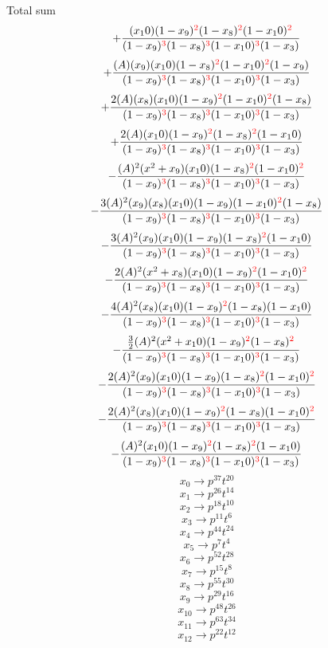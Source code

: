 \documentclass{article}
\begin{document}
Total sum
\[+\frac{(x_10)(1-x_9)^{\textcolor{red}{2}}(1-x_8)^{\textcolor{red}{2}}(1-x_10)^{\textcolor{red}{2}}}{(1-x_9)^{\textcolor{red}{3}}(1-x_8)^{\textcolor{red}{3}}(1-x_10)^{\textcolor{red}{3}}(1-x_3)}\]\[+\frac{(A)(x_9)(x_10)(1-x_8)^{\textcolor{red}{2}}(1-x_10)^{\textcolor{red}{2}}(1-x_9)}{(1-x_9)^{\textcolor{red}{3}}(1-x_8)^{\textcolor{red}{3}}(1-x_10)^{\textcolor{red}{3}}(1-x_3)}\]\[+\frac{2(A)(x_8)(x_10)(1-x_9)^{\textcolor{red}{2}}(1-x_10)^{\textcolor{red}{2}}(1-x_8)}{(1-x_9)^{\textcolor{red}{3}}(1-x_8)^{\textcolor{red}{3}}(1-x_10)^{\textcolor{red}{3}}(1-x_3)}\]\[+\frac{2(A)(x_10)(1-x_9)^{\textcolor{red}{2}}(1-x_8)^{\textcolor{red}{2}}(1-x_10)}{(1-x_9)^{\textcolor{red}{3}}(1-x_8)^{\textcolor{red}{3}}(1-x_10)^{\textcolor{red}{3}}(1-x_3)}\]\[-\frac{(A)^{2}(x^{2}+x_9)(x_10)(1-x_8)^{\textcolor{red}{2}}(1-x_10)^{\textcolor{red}{2}}}{(1-x_9)^{\textcolor{red}{3}}(1-x_8)^{\textcolor{red}{3}}(1-x_10)^{\textcolor{red}{3}}(1-x_3)}\]\[-\frac{3(A)^{2}(x_9)(x_8)(x_10)(1-x_9)(1-x_10)^{\textcolor{red}{2}}(1-x_8)}{(1-x_9)^{\textcolor{red}{3}}(1-x_8)^{\textcolor{red}{3}}(1-x_10)^{\textcolor{red}{3}}(1-x_3)}\]\[-\frac{3(A)^{2}(x_9)(x_10)(1-x_9)(1-x_8)^{\textcolor{red}{2}}(1-x_10)}{(1-x_9)^{\textcolor{red}{3}}(1-x_8)^{\textcolor{red}{3}}(1-x_10)^{\textcolor{red}{3}}(1-x_3)}\]\[-\frac{2(A)^{2}(x^{2}+x_8)(x_10)(1-x_9)^{\textcolor{red}{2}}(1-x_10)^{\textcolor{red}{2}}}{(1-x_9)^{\textcolor{red}{3}}(1-x_8)^{\textcolor{red}{3}}(1-x_10)^{\textcolor{red}{3}}(1-x_3)}\]\[-\frac{4(A)^{2}(x_8)(x_10)(1-x_9)^{\textcolor{red}{2}}(1-x_8)(1-x_10)}{(1-x_9)^{\textcolor{red}{3}}(1-x_8)^{\textcolor{red}{3}}(1-x_10)^{\textcolor{red}{3}}(1-x_3)}\]\[-\frac{\frac{3}{2}(A)^{2}(x^{2}+x_10)(1-x_9)^{\textcolor{red}{2}}(1-x_8)^{\textcolor{red}{2}}}{(1-x_9)^{\textcolor{red}{3}}(1-x_8)^{\textcolor{red}{3}}(1-x_10)^{\textcolor{red}{3}}(1-x_3)}\]\[-\frac{2(A)^{2}(x_9)(x_10)(1-x_9)(1-x_8)^{\textcolor{red}{2}}(1-x_10)^{\textcolor{red}{2}}}{(1-x_9)^{\textcolor{red}{3}}(1-x_8)^{\textcolor{red}{3}}(1-x_10)^{\textcolor{red}{3}}(1-x_3)}\]\[-\frac{2(A)^{2}(x_8)(x_10)(1-x_9)^{\textcolor{red}{2}}(1-x_8)(1-x_10)^{\textcolor{red}{2}}}{(1-x_9)^{\textcolor{red}{3}}(1-x_8)^{\textcolor{red}{3}}(1-x_10)^{\textcolor{red}{3}}(1-x_3)}\]\[-\frac{(A)^{2}(x_10)(1-x_9)^{\textcolor{red}{2}}(1-x_8)^{\textcolor{red}{2}}(1-x_10)}{(1-x_9)^{\textcolor{red}{3}}(1-x_8)^{\textcolor{red}{3}}(1-x_10)^{\textcolor{red}{3}}(1-x_3)}\]\[x_0\rightarrow{p^{37}t^{20}}\]\[x_1\rightarrow{p^{26}t^{14}}\]\[x_2\rightarrow{p^{18}t^{10}}\]\[x_3\rightarrow{p^{11}t^{6}}\]\[x_4\rightarrow{p^{44}t^{24}}\]\[x_5\rightarrow{p^{7}t^{4}}\]\[x_6\rightarrow{p^{52}t^{28}}\]\[x_7\rightarrow{p^{15}t^{8}}\]\[x_8\rightarrow{p^{55}t^{30}}\]\[x_9\rightarrow{p^{29}t^{16}}\]\[x_10\rightarrow{p^{48}t^{26}}\]\[x_11\rightarrow{p^{63}t^{34}}\]\[x_12\rightarrow{p^{22}t^{12}}\]
\end{document}
